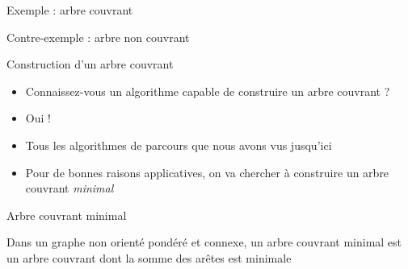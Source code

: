 \begin{frame}{Exemple : arbre couvrant}
    \begin{center}
        
    \end{center}
    \end{frame}

    \begin{frame}{Contre-exemple : arbre non couvrant}
        \begin{center}
            
        \end{center}
        \end{frame}
    
\begin{frame}{Construction d'un arbre couvrant}
\begin{itemize}
    \item Connaissez-vous un algorithme capable de construire un arbre couvrant ?
    \pause \item Oui !
    \pause \item Tous les algorithmes de parcours que nous avons vus jusqu'ici 
    \pause \item Pour de bonnes raisons applicatives, on va chercher à construire un arbre couvrant \emph{minimal} 
\end{itemize}
    
\end{frame}

\begin{frame}{Arbre couvrant minimal}
    \begin{definition}
        Dans un graphe non orienté pondéré et connexe, un arbre couvrant minimal est un arbre couvrant dont la somme des arêtes est minimale
    \end{definition}
\end{frame}




